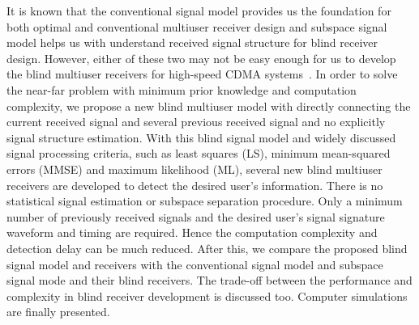 \documentclass[a4paper,10pt,fleqn, twocolumn]{IEEETran}
\begin{document}
It is known that the conventional signal model provides us the
foundation for both optimal and conventional multiuser receiver
design and subspace signal model helps us with understand received
signal structure for blind receiver design. However, either of
these two may not be easy enough for us to develop the blind
multiuser receivers for high-speed CDMA systems~\cite{Andr05}. In
order to solve the near-far problem with minimum prior knowledge
and computation complexity, we propose a new blind multiuser model
with directly connecting the current received signal and several
previous received signal and no explicitly signal structure
estimation. With this blind signal model and widely discussed
signal processing criteria, such as least squares (LS), minimum
mean-squared errors (MMSE) and maximum likelihood (ML), several
new blind multiuser receivers are developed to detect the desired
user's information. There is no statistical signal estimation or
subspace separation procedure. Only a minimum number of previously
received signals and the desired user's signal signature waveform
and timing are required. Hence the computation complexity and
detection delay can be much reduced. After this, we compare the
proposed blind signal model and receivers with the conventional
signal model and subspace signal mode and their blind receivers.
The trade-off between the performance and complexity in blind
receiver development is discussed too. Computer simulations are
finally presented.
\end{document}
